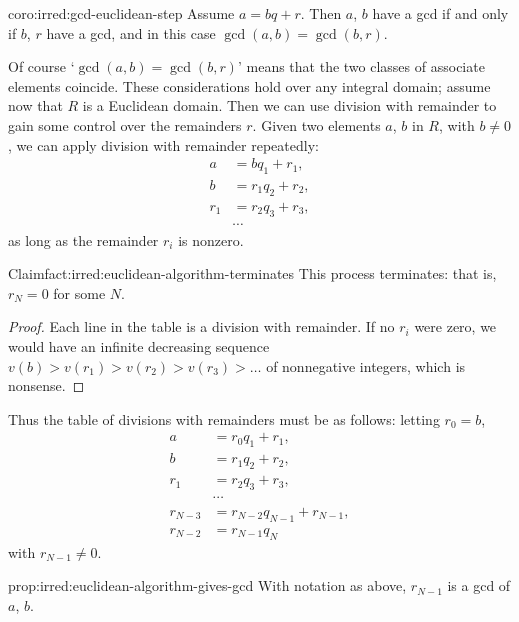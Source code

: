 \begin{coro}{}{coro:irred:gcd-euclidean-step}
  Assume $a = bq + r$. Then $a$, $b$ have a gcd if and only if $b$,
  $r$ have a gcd, and in this case $\gcd(a, b) = \gcd(b, r)$.
\end{coro}

Of course `$\gcd(a, b) = \gcd(b, r)$' means that the two classes of
associate elements coincide.  These considerations hold over any
integral domain; assume now that $R$ is a Euclidean domain. Then we
can use division with remainder to gain some control over the
remainders $r$. Given two elements $a$, $b$ in $R$, with $b \neq 0$,
we can apply division with remainder repeatedly:
\begin{align*}
  a &= bq_1 + r_1, \\
  b &= r_1 q_2 + r_2, \\
  r_1 &= r_2 q_3 + r_3, \\
    &\cdots
\end{align*}
as long as the remainder $r_i$ is nonzero.

\begin{fact}{Claim}{fact:irred:euclidean-algorithm-terminates}
  This process terminates: that is, $r_N = 0$ for some $N$.
\end{fact}

\begin{proof}
  Each line in the table is a division with remainder. If no $r_i$
  were zero, we would have an infinite decreasing sequence
  $v(b) > v(r_1) > v(r_2) > v(r_3) > \dots$ of nonnegative integers,
  which is nonsense.
\end{proof}
Thus the table of divisions with remainders must be as follows:
letting $r_0 = b$,
\begin{align*}
  a &= r_0 q_1 + r_1, \\
  b &= r_1 q_2 + r_2, \\
  r_1 &= r_2 q_3 + r_3, \\
    &\cdots \\
  r_{N-3} &= r_{N-2} q_{N-1} + r_{N-1}, \\
  r_{N-2} &= r_{N-1} q_N
\end{align*}
with $r_{N-1} \neq 0$.

\begin{prop}{}{prop:irred:euclidean-algorithm-gives-gcd}
  With notation as above, $r_{N-1}$ is a gcd of $a$, $b$.
\end{prop}

